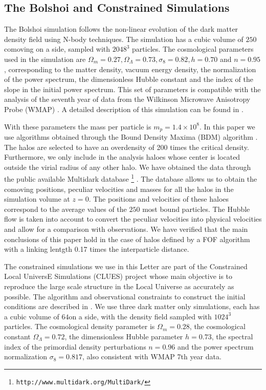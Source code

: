 \documentclass{emulateapj}
\newcommand{\hMpc}{{\ifmmode{h^{-1}{\rm Mpc}}\else{$h^{-1}$Mpc }\fi}}
\newcommand{\hMsun}{{\ifmmode{h^{-1}{\rm {M_{\odot}}}}\else{$h^{-1}{\rm{M_{\odot}}}$}\fi}}
\begin{document}
\subsection{The Bolshoi and Constrained Simulations}



The Bolshoi simulation follows the non-linear evolution of the dark
matter density field using N-body techniques. The simulation has a
cubic volume of $250$\hMpc comoving on a side, sampled with $2048^{3}$
particles. The cosmological parameters used in the simulation are
$\Omega_{m}=0.27, \Omega_{\Lambda}=0.73, \sigma_{8}=0.82, h=0.70$ and
$n=0.95$, corresponding to the matter density, vacuum energy density,
the normalization of the power spectrum, the dimensionless Hubble
constant and the index of the slope in the initial power
spectrum. This set of parameters is compatible with the analysis  of
the seventh year of data from the Wilkinson Microwave Anisotropy Probe
(WMAP) \citep{Jarosik2011}. A detailed description of this simulation
can be found in \citep{Bolshoi}. 

With these parameters the mass per particle is $m_{p}=1.4\times
10^{8}$\hMsun. In this paper we use algorithms obtained through the
Bound Density Maxima (BDM) algorithm \citep{KlypinBDM}. The halos are
selected to have an overdensity of 200 times the critical
density. Furthermore, we only include in the analysis haloes whose
center is located outside the virial radius of any other halo.  We
have obtained the data through the public available Multidark
database \footnote{{\tt http://www.multidark.org/MultiDark/}}
\citep{2011arXiv1109.0003R}. The database allows us to obtain the
comoving positions, peculiar velocities and masses for all the halos
in the simulation volume at $z=0$. The positions and velocities of
these haloes correspond to the average values of the $250$ most bound
particles. The Hubble flow is taken into account to convert the
peculiar velocities into physical velocities and allow for a
comparison with observations. We have verified that the main
conclusions of this paper hold in the case of halos defined by a FOF
algorithm with a linking lentgth 0.17 times the interparticle
distance. 

The constrained simulations we use in this Letter are part of the
Constrained Local UniversE Simulations (CLUES) project whose main
objective is to reproduce the large scale structure in the Local
Universe as accurately as possible. The algorithm and observational
constraints to construct the initial conditions are  described in
\citep{clues2010}.  We use three dark matter only simulations, each
has a cubic volume of $64$\hMpc on a side, with the density field
sampled with $1024^3$ particles. The cosmological density parameter is
$\Omega_m=0.28$, the cosmological constant $\Omega_{\Lambda}=0.72$,
the dimensionless Hubble parameter $h=0.73$, the spectral index of the
primordial density perturbations $n=0.96$ and the power spectrum
normalization $\sigma_{8}=0.817$, also consistent with WMAP 7th year
data.  
\end{document}
